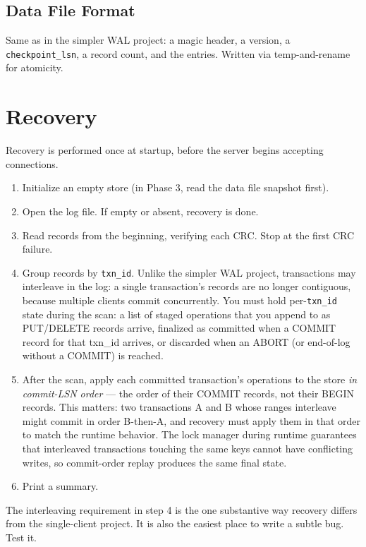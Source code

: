 \documentclass[11pt,a4paper]{article}
\begin{document}
\subsection{Data File Format}
Same as in the simpler WAL project: a magic header, a version, a \texttt{checkpoint\_lsn}, a record count, and the entries. Written via temp-and-rename for atomicity.

\section{Recovery}

Recovery is performed once at startup, before the server begins accepting connections.

\begin{enumerate}
\item Initialize an empty store (in Phase 3, read the data file snapshot first).
\item Open the log file. If empty or absent, recovery is done.
\item Read records from the beginning, verifying each CRC. Stop at the first CRC failure.
\item Group records by \texttt{txn\_id}. Unlike the simpler WAL project, transactions may interleave in the log: a single transaction's records are no longer contiguous, because multiple clients commit concurrently. You must hold per-\texttt{txn\_id} state during the scan: a list of staged operations that you append to as PUT/DELETE records arrive, finalized as committed when a COMMIT record for that txn\_id arrives, or discarded when an ABORT (or end-of-log without a COMMIT) is reached.
\item After the scan, apply each committed transaction's operations to the store \textit{in commit-LSN order} --- the order of their COMMIT records, not their BEGIN records. This matters: two transactions A and B whose ranges interleave might commit in order B-then-A, and recovery must apply them in that order to match the runtime behavior. The lock manager during runtime guarantees that interleaved transactions touching the same keys cannot have conflicting writes, so commit-order replay produces the same final state.
\item Print a summary.
\end{enumerate}

The interleaving requirement in step 4 is the one substantive way recovery differs from the single-client project. It is also the easiest place to write a subtle bug. Test it.
\end{document}
